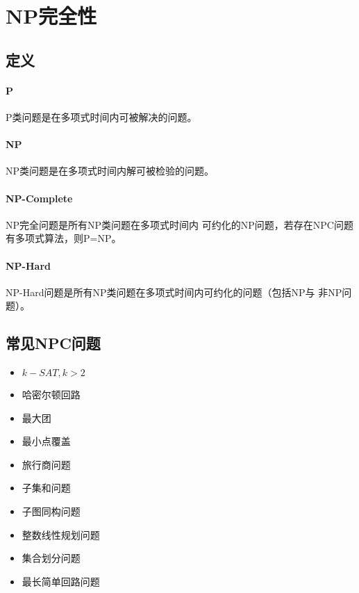 \section{NP完全性}
\subsection{定义}
\paragraph{P} P类问题是在多项式时间内可被解决的问题。
\paragraph{NP} NP类问题是在多项式时间内解可被检验的问题。
\paragraph{NP-Complete} NP完全问题是所有NP类问题在多项式时间内
可约化的NP问题，若存在NPC问题有多项式算法，则P=NP。
\paragraph{NP-Hard}NP-Hard问题是所有NP类问题在多项式时间内可约化的问题（包括NP与
非NP问题）。
\subsection{常见NPC问题}
\begin{itemize}
    \item $k-SAT,k>2$
    \item 哈密尔顿回路
    \item 最大团
    \item 最小点覆盖
    \item 旅行商问题
    \item 子集和问题
    \item 子图同构问题
    \item 整数线性规划问题
    \item 集合划分问题
    \item 最长简单回路问题
\end{itemize}

